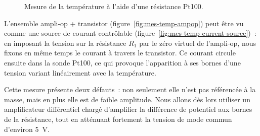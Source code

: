 \documentclass[11pt,a4paper]{article}
\theoremstyle{definition}%
\begin{document}
\begin{figure}[H]
\shorthandoff{:!;}
\center
\caption{Mesure de la température à l'aide d'une résistance Pt100.}
\label{fig:mes-temp}
\shorthandon{:!;}
\end{figure}

L’ensemble ampli-op + transistor (figure~\ref{fig:mes-temp-ampop}) peut être vu comme une source de courant contrôlable (figure~\ref{fig:mes-temp-current-source})~: en imposant la tension sur la résistance $R_1$ par le zéro virtuel de l’ampli-op, nous fixons en même temps le courant à travers le transistor.
Ce courant circule ensuite dans la sonde Pt100, ce qui provoque l’apparition à ses bornes d’une tension variant linéairement avec la température.

Cette mesure présente deux défauts~: non seulement elle n’est pas référencée à la masse, mais en plus elle est de faible amplitude.
Nous allons dès lors utiliser un amplificateur différentiel chargé d’amplifier la différence de potentiel aux bornes de la résistance, tout en atténuant fortement la tension de mode commun d'environ 5~V.
\end{document}
